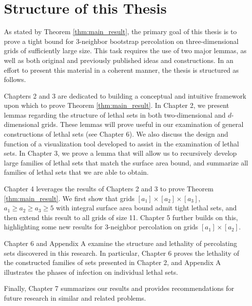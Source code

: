 
\section{Structure of this Thesis}

As stated by Theorem \ref{thm:main_result}, the primary goal of this thesis is to prove a tight bound for 3-neighbor bootstrap percolation on three-dimensional grids of sufficiently large size. This task requires the use of two major lemmas, as well as both original and previously published ideas and constructions. In an effort to present this material in a coherent manner, the thesis is structured as follows. 

Chapters 2 and 3 are dedicated to building a conceptual and intuitive framework upon which to prove Theorem \ref{thm:main_result}. In Chapter 2, we present lemmas regarding the structure of lethal sets in both two-dimensional and $d$-dimensional grids. These lemmas will prove useful in our examination of general constructions of lethal sets (see Chapter 6). We also discuss the design and function of a visualization tool developed to assist in the examination of lethal sets. In Chapter 3, we prove a lemma that will allow us to recursively develop large families of lethal sets that match the surface area bound, and summarize all families of lethal sets that we are able to obtain. 

Chapter 4 leverages the results of Chapters 2 and 3 to prove Theorem \ref{thm:main_result}. We first show that grids $[a_1] \times [a_2] \times [a_3]$, $a_1 \geq a_2 \geq a_3 \geq 5$ with integral surface area bound admit tight lethal sets, and then extend this result to all grids of size 11. Chapter 5 further builds on this, highlighting some new results for 3-neighbor percolation on grids $[a_1] \times [a_2]$.

Chapter 6 and Appendix A examine the structure and lethality of percolating sets discovered in this research. In particular, Chapter 6 proves the lethality of the constructed families of sets presented in Chapter 2, and Appendix A illustrates the phases of infection on individual lethal sets.

Finally, Chapter 7 summarizes our results and provides recommendations for future research in similar and related problems. 

